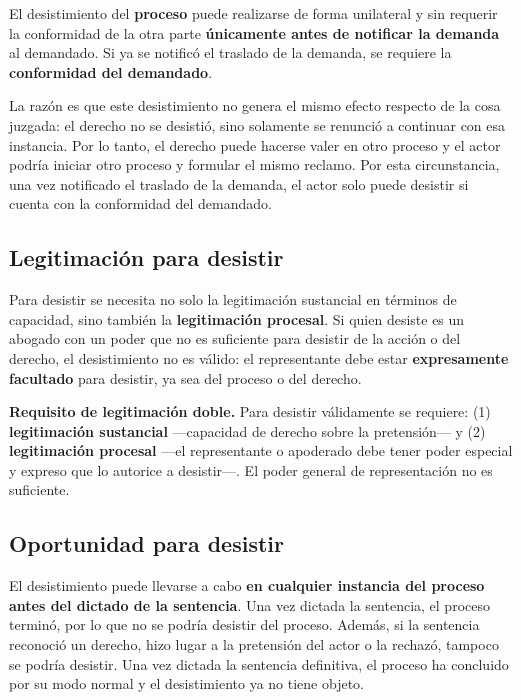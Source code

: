 \documentclass[12pt,oneside]{book}
\begin{document}
El desistimiento del \textbf{proceso} puede realizarse de forma unilateral y sin requerir la conformidad de la otra parte \textbf{únicamente antes de notificar la demanda} al demandado. Si ya se notificó el traslado de la demanda, se requiere la \textbf{conformidad del demandado}.

La razón es que este desistimiento no genera el mismo efecto respecto de la cosa juzgada: el derecho no se desistió, sino solamente se renunció a continuar con esa instancia. Por lo tanto, el derecho puede hacerse valer en otro proceso y el actor podría iniciar otro proceso y formular el mismo reclamo. Por esta circunstancia, una vez notificado el traslado de la demanda, el actor solo puede desistir si cuenta con la conformidad del demandado.

\subsection{Legitimación para desistir}

Para desistir se necesita no solo la legitimación sustancial en términos de capacidad, sino también la \textbf{legitimación procesal}. Si quien desiste es un abogado con un poder que no es suficiente para desistir de la acción o del derecho, el desistimiento no es válido: el representante debe estar \textbf{expresamente facultado} para desistir, ya sea del proceso o del derecho.

\begin{important}
\textbf{Requisito de legitimación doble.} Para desistir válidamente se requiere: (1) \textbf{legitimación sustancial} ---capacidad de derecho sobre la pretensión--- y (2) \textbf{legitimación procesal} ---el representante o apoderado debe tener poder especial y expreso que lo autorice a desistir---. El poder general de representación no es suficiente.
\end{important}

\subsection{Oportunidad para desistir}

El desistimiento puede llevarse a cabo \textbf{en cualquier instancia del proceso antes del dictado de la sentencia}. Una vez dictada la sentencia, el proceso terminó, por lo que no se podría desistir del proceso. Además, si la sentencia reconoció un derecho, hizo lugar a la pretensión del actor o la rechazó, tampoco se podría desistir. Una vez dictada la sentencia definitiva, el proceso ha concluido por su modo normal y el desistimiento ya no tiene objeto.
\end{document}
